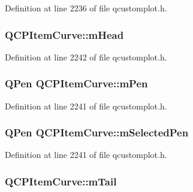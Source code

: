 Definition at line 2236 of file qcustomplot.\-h.

\hypertarget{class_q_c_p_item_curve_af2cc26ff199570940dc96f5ec19a13f8}{
\subsubsection[{m\-Head}]{ Q\-C\-P\-Item\-Curve\-::m\-Head\hspace{0.3cm}{\ttfamily [protected]}}}\label{class_q_c_p_item_curve_af2cc26ff199570940dc96f5ec19a13f8}


Definition at line 2242 of file qcustomplot.\-h.

\hypertarget{class_q_c_p_item_curve_a7ef92988d1db2e4d0311e34c0a57fe42}{
\subsubsection[{m\-Pen}]{\setlength{\rightskip}{0pt plus 5cm}Q\-Pen Q\-C\-P\-Item\-Curve\-::m\-Pen\hspace{0.3cm}{\ttfamily [protected]}}}\label{class_q_c_p_item_curve_a7ef92988d1db2e4d0311e34c0a57fe42}


Definition at line 2241 of file qcustomplot.\-h.

\hypertarget{class_q_c_p_item_curve_ab22cbab261b20be5aa8e4ca252149246}{
\subsubsection[{m\-Selected\-Pen}]{\setlength{\rightskip}{0pt plus 5cm}Q\-Pen Q\-C\-P\-Item\-Curve\-::m\-Selected\-Pen\hspace{0.3cm}{\ttfamily [protected]}}}\label{class_q_c_p_item_curve_ab22cbab261b20be5aa8e4ca252149246}


Definition at line 2241 of file qcustomplot.\-h.

\hypertarget{class_q_c_p_item_curve_af1dca285b97e3f5b892dab827a79f327}{
\subsubsection[{m\-Tail}]{ Q\-C\-P\-Item\-Curve\-::m\-Tail\hspace{0.3cm}{\ttfamily [protected]}}}\label{class_q_c_p_item_curve_af1dca285b97e3f5b892dab827a79f327}


